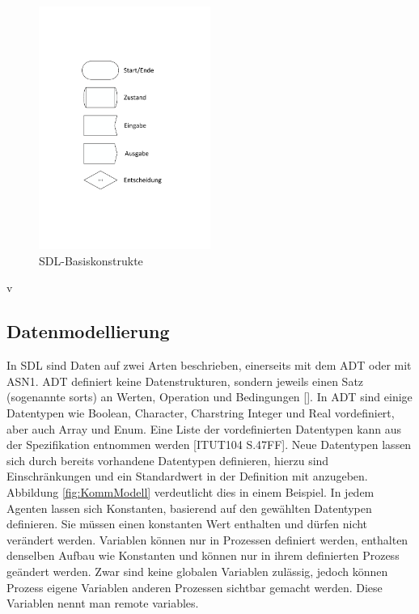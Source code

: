 \begin{figure}[h]
	\centering
	\includegraphics[width=0.5\textwidth]{Graphics/Basiskonstrukte.pdf}
	\caption{SDL-Basiskonstrukte}
	\label{fig:Basiskonstrukte}
\end{figure}v


\subsection{Datenmodellierung}
\label{ssc:Daten}
In \ac{SDL} sind Daten auf zwei Arten beschrieben, einerseits mit dem \acs{ADT} oder mit \ac{ASN1}. \ac{ADT} definiert keine Datenstrukturen, sondern jeweils einen Satz (sogenannte sorts) an Werten, Operation und Bedingungen [\cite[67]{ITUT104_2016}]. In \ac{ADT} sind einige Datentypen wie Boolean, Character, Charstring Integer und Real vordefiniert, aber auch Array und Enum. Eine Liste der vordefinierten Datentypen kann aus der Spezifikation entnommen werden [ITUT104 S.47FF]. Neue Datentypen lassen sich durch bereits vorhandene Datentypen definieren, hierzu sind Einschränkungen und ein Standardwert in der Definition mit anzugeben. Abbildung \ref{fig:KommModell} verdeutlicht dies in einem Beispiel. In jedem Agenten lassen sich Konstanten, basierend auf den gewählten Datentypen definieren. Sie müssen einen konstanten Wert enthalten und dürfen nicht verändert werden. Variablen können nur in Prozessen definiert werden, enthalten denselben Aufbau wie Konstanten und können nur in ihrem definierten Prozess geändert werden. Zwar sind keine globalen Variablen zulässig, jedoch können Prozess eigene Variablen anderen Prozessen sichtbar gemacht werden. Diese Variablen nennt man remote variables.

